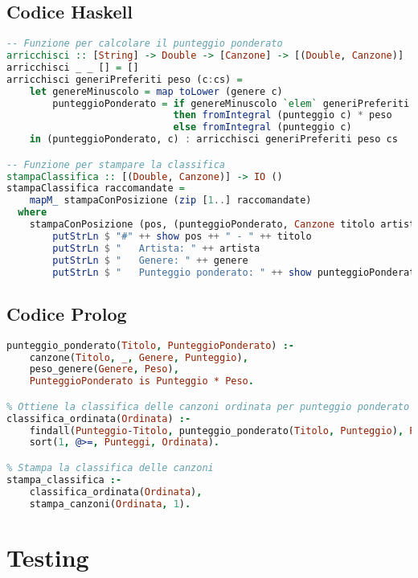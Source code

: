 \documentclass[a4paper,11pt]{article}
\begin{document}
\subsection{Codice Haskell}
\begin{lstlisting}[language=Haskell, caption=Estratto del codice Haskell]
-- Funzione per calcolare il punteggio ponderato
arricchisci :: [String] -> Double -> [Canzone] -> [(Double, Canzone)]
arricchisci _ _ [] = []
arricchisci generiPreferiti peso (c:cs) =
    let genereMinuscolo = map toLower (genere c)
        punteggioPonderato = if genereMinuscolo `elem` generiPreferiti
                             then fromIntegral (punteggio c) * peso
                             else fromIntegral (punteggio c)
    in (punteggioPonderato, c) : arricchisci generiPreferiti peso cs

-- Funzione per stampare la classifica
stampaClassifica :: [(Double, Canzone)] -> IO ()
stampaClassifica raccomandate =
    mapM_ stampaConPosizione (zip [1..] raccomandate)
  where
    stampaConPosizione (pos, (punteggioPonderato, Canzone titolo artista genere _)) = do
        putStrLn $ "#" ++ show pos ++ " - " ++ titolo
        putStrLn $ "   Artista: " ++ artista
        putStrLn $ "   Genere: " ++ genere
        putStrLn $ "   Punteggio ponderato: " ++ show punteggioPonderato
\end{lstlisting}

\subsection{Codice Prolog}
\begin{lstlisting}[language=Prolog, caption=Estratto del codice Prolog]
% Calcola il punteggio ponderato di una canzone
punteggio_ponderato(Titolo, PunteggioPonderato) :-
    canzone(Titolo, _, Genere, Punteggio),
    peso_genere(Genere, Peso),
    PunteggioPonderato is Punteggio * Peso.

% Ottiene la classifica delle canzoni ordinata per punteggio ponderato
classifica_ordinata(Ordinata) :-
    findall(Punteggio-Titolo, punteggio_ponderato(Titolo, Punteggio), Punteggi),
    sort(1, @>=, Punteggi, Ordinata).

% Stampa la classifica delle canzoni
stampa_classifica :- 
    classifica_ordinata(Ordinata),
    stampa_canzoni(Ordinata, 1).
\end{lstlisting}

\section{Testing}
\end{document}
